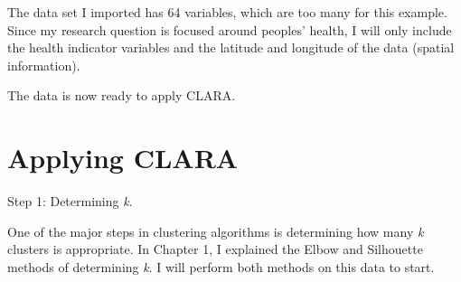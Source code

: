 \documentclass[12pt,twoside]{amherstthesis}
\begin{document}
  The data set I imported has 64 variables, which are too many for this
  example. Since my research question is focused around peoples' health, I
  will only include the health indicator variables and the latitude and
  longitude of the data (spatial information).
  
  \begin{Shaded}
  \begin{Highlighting}[]
  \StringTok{ }\NormalTok{(}\NormalTok{, }\NormalTok{, }\NormalTok{, }\NormalTok{, }\NormalTok{, }\NormalTok{)}
  \StringTok{ }
  \end{Highlighting}
  \end{Shaded}
  
  The data is now ready to apply CLARA.
  
  \section{Applying CLARA}\label{applying-clara}
  
  Step 1: Determining \emph{k}.
  
  One of the major steps in clustering algorithms is determining how many
  \emph{k} clusters is appropriate. In Chapter 1, I explained the Elbow
  and Silhouette methods of determining \emph{k}. I will perform both
  methods on this data to start.
  
  \begin{Shaded}
  \begin{Highlighting}[]
  
  \StringTok{ }
  
   \NormalTok{) }\OperatorTok{+}
  \StringTok{    }\NormalTok{(} \NormalTok{, } \NormalTok{)}\OperatorTok{+}
  \StringTok{  }\NormalTok{(} \NormalTok{)}
  \end{Highlighting}
  \end{Shaded}
  
\end{document}
